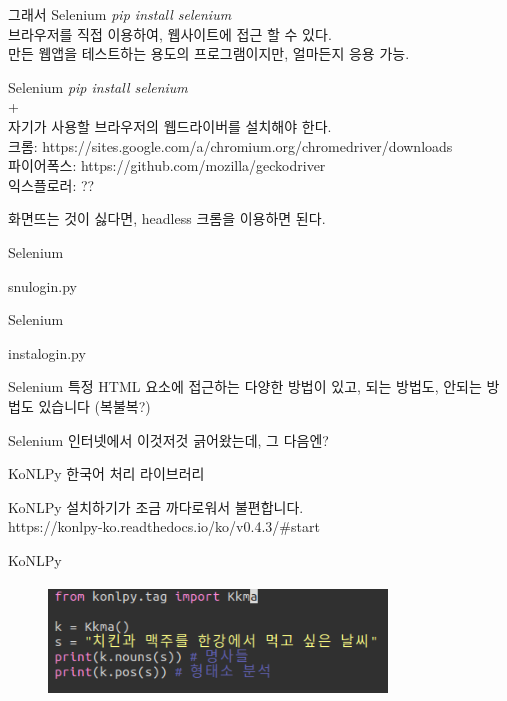 \documentclass{beamer}
\begin{document}
\begin{frame}{그래서 Selenium}
\textit{pip install selenium}\\
브라우저를 직접 이용하여, 웹사이트에 접근 할 수 있다.\\
만든 웹앱을 테스트하는 용도의 프로그램이지만, 얼마든지 응용 가능.
\end{frame}

\begin{frame}{Selenium}
\textit{pip install selenium}\\
+\\
자기가 사용할 브라우저의 웹드라이버를 설치해야 한다.\\
크롬: https://sites.google.com/a/chromium.org/chromedriver/downloads\\
파이어폭스: https://github.com/mozilla/geckodriver\\
익스플로러: ??

화면뜨는 것이 싫다면, headless 크롬을 이용하면 된다.
\end{frame}

\begin{frame}{Selenium}
\begin{lstinputlisting}
  {snulogin.py}
\end{lstinputlisting}
\end{frame}

\begin{frame}{Selenium}
\begin{lstinputlisting}
  {instalogin.py}
\end{lstinputlisting}
\end{frame}

\begin{frame}{Selenium}
특정 HTML 요소에 접근하는 다양한 방법이 있고, 되는 방법도, 안되는 방법도
  있습니다 (복불복?)
\end{frame}

\begin{frame}{Selenium}
인터넷에서 이것저것 긁어왔는데, 그 다음엔?
\end{frame}

\begin{frame}{KoNLPy}
한국어 처리 라이브러리
\end{frame}

\begin{frame}{KoNLPy}
설치하기가 조금 까다로워서 불편합니다.\\
https://konlpy-ko.readthedocs.io/ko/v0.4.3/\#start
\end{frame}

\begin{frame}{KoNLPy}
\begin{figure}[H]
  \centering
  \includegraphics[width=90mm,height=30mm]{korean.png}
\end{figure}
\end{frame}
\end{document}
